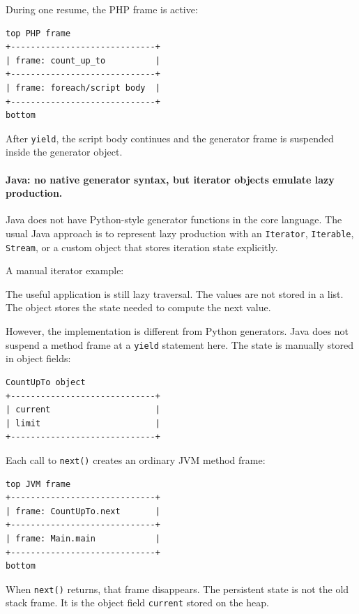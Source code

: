 During one resume, the PHP frame is active:

\begin{verbatim}
top PHP frame
+-----------------------------+
| frame: count_up_to          |
+-----------------------------+
| frame: foreach/script body  |
+-----------------------------+
bottom
\end{verbatim}

After \texttt{yield}, the script body continues and the generator frame is suspended inside the generator object.

\paragraph{Java: no native generator syntax, but iterator objects emulate lazy production.}

Java does not have Python-style generator functions in the core language. The usual Java approach is to represent lazy production with an \texttt{Iterator}, \texttt{Iterable}, \texttt{Stream}, or a custom object that stores iteration state explicitly.

A manual iterator example:

The useful application is still lazy traversal. The values are not stored in a list. The object stores the state needed to compute the next value.

However, the implementation is different from Python generators. Java does not suspend a method frame at a \texttt{yield} statement here. The state is manually stored in object fields:

\begin{verbatim}
CountUpTo object
+-----------------------------+
| current                     |
| limit                       |
+-----------------------------+
\end{verbatim}

Each call to \texttt{next()} creates an ordinary JVM method frame:

\begin{verbatim}
top JVM frame
+-----------------------------+
| frame: CountUpTo.next       |
+-----------------------------+
| frame: Main.main            |
+-----------------------------+
bottom
\end{verbatim}

When \texttt{next()} returns, that frame disappears. The persistent state is not the old stack frame. It is the object field \texttt{current} stored on the heap.


